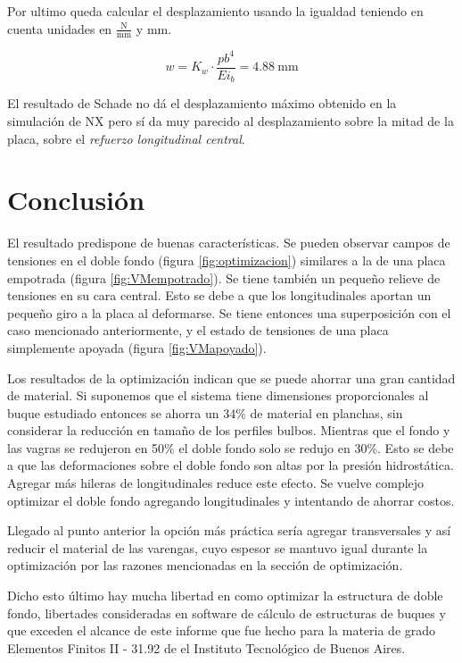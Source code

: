 \documentclass[onecolumn,10pt,titlepage]{article}
\begin{document}
Por ultimo queda calcular el desplazamiento usando la igualdad teniendo en cuenta unidades en $\frac{\si{\newton}}{\si{\milli \meter}}$ y $\si{\milli \meter}$.

\[
w = K_w \cdot \frac{ p b^4  }{E i_b} = \SI{4,88}{\milli \meter}
\]

El resultado de Schade no dá el desplazamiento máximo obtenido en la simulación de NX pero sí da muy parecido al desplazamiento sobre la mitad de la placa, sobre el \emph{refuerzo longitudinal central}.


\section{Conclusión}
El resultado predispone de buenas características. Se pueden observar campos de tensiones en el doble fondo (figura \ref{fig:optimizacion}) similares a la de una placa empotrada (figura \ref{fig:VMempotrado}). Se tiene también un pequeño relieve de tensiones en su cara central. Esto se debe a que los longitudinales aportan un pequeño giro a la placa al deformarse. Se tiene entonces una superposición con el caso mencionado anteriormente, y el estado de tensiones de una placa simplemente apoyada (figura \ref{fig:VMapoyado}).


Los resultados de la optimización indican que se puede ahorrar una gran cantidad de material. Si suponemos que el sistema tiene dimensiones proporcionales al buque estudiado entonces se ahorra un 34\% de material en planchas, sin considerar la reducción en tamaño de los perfiles bulbos. Mientras que el fondo y las vagras se redujeron en 50\% el doble fondo solo se redujo en 30\%. Esto se debe a que las deformaciones sobre el doble fondo son altas por la presión hidrostática. Agregar más hileras de longitudinales reduce este efecto. Se vuelve complejo optimizar el doble fondo agregando longitudinales y intentando de ahorrar costos. 

Llegado al punto anterior la opción más práctica sería agregar transversales  y así reducir el material de las varengas, cuyo espesor se mantuvo igual durante la optimización por las razones mencionadas en la sección de optimización.

Dicho esto último hay mucha libertad en como optimizar la estructura de doble fondo, libertades consideradas en software de cálculo de estructuras de buques y que exceden el alcance de este informe que fue hecho para la materia de grado Elementos Finitos II - 31.92 de el Instituto Tecnológico de Buenos Aires.

\clearpage
 
\end{document}
